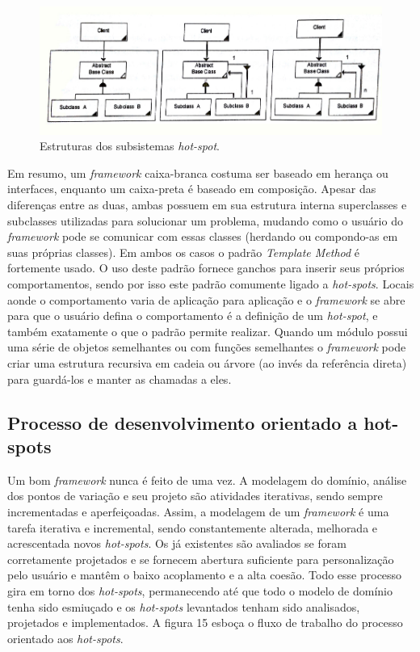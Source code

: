 \begin{figure}[h]
	\centering
	\label{fig14}
		\includegraphics[keepaspectratio=true,scale=0.4]{figuras/subsistemaHotspot.jpg}
	\caption{Estruturas dos subsistemas \textit{hot-spot}. \cite{Fayad1999}}
\end{figure}

Em resumo, um \textit{framework} caixa-branca costuma ser baseado em herança ou interfaces, enquanto um caixa-preta é baseado em composição. Apesar das diferenças entre as duas, ambas possuem em sua estrutura interna superclasses e subclasses utilizadas para solucionar um problema, mudando como o usuário do \textit{framework} pode se comunicar com essas classes (herdando ou compondo-as em suas próprias classes). Em ambos os casos o padrão \textit{Template Method} é fortemente usado. O uso deste padrão fornece ganchos para inserir seus próprios comportamentos, sendo por isso este padrão comumente ligado a \textit{hot-spots}. Locais aonde o comportamento varia de aplicação para aplicação e o \textit{framework} se abre para que o usuário defina o comportamento é a definição de um \textit{hot-spot}, e também exatamente o que o padrão permite realizar. Quando um módulo possui uma série de objetos semelhantes ou com funções semelhantes o \textit{framework} pode criar uma estrutura recursiva em cadeia ou árvore (ao invés da referência direta) para guardá-los e manter as chamadas a eles.

\subsection{Processo de desenvolvimento orientado a hot-spots}

Um bom \textit{framework} nunca é feito de uma vez. A modelagem do domínio, análise dos pontos de variação e seu projeto são atividades iterativas, sendo sempre incrementadas e aperfeiçoadas. Assim, a modelagem de um \textit{framework} é uma tarefa iterativa e incremental, sendo constantemente alterada, melhorada e acrescentada novos \textit{hot-spots}. Os já existentes são avaliados se foram corretamente projetados e se fornecem abertura suficiente para personalização pelo usuário e mantêm o baixo acoplamento e a alta coesão. Todo esse processo gira em torno dos \textit{hot-spots}, permanecendo até que todo o modelo de domínio tenha sido esmiuçado e os \textit{hot-spots} levantados tenham sido analisados, projetados e implementados. A figura 15 esboça o fluxo de trabalho do processo orientado aos \textit{hot-spots}.

